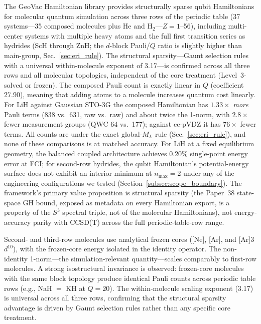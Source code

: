 \documentclass[twocolumn,pra,amsmath,amssymb,superscriptaddress]{revtex4-2}
\newcommand{\gvq}[2]{#2}
\begin{document}
The GeoVac Hamiltonian library provides structurally sparse qubit
Hamiltonians for molecular quantum simulation across three rows
of the periodic table (37 systems---35 composed molecules plus He and
H$_2$---$Z = 1$--56), including multi-center systems with multiple heavy
atoms and the full first transition series as hydrides (ScH through ZnH;
the $d$-block Pauli/$Q$ ratio is slightly higher than main-group,
Sec.~\ref{sec:eri_rule}).  The
structural sparsity---Gaunt selection
rules with a universal within-molecule exponent of 3.17---is confirmed
across all three rows and all molecular
topologies, independent of the core treatment (Level~3-solved or frozen).
The composed Pauli count is exactly linear in $Q$ (coefficient
$27.90$), meaning that adding atoms to a molecule increases
quantum cost linearly.
For LiH against Gaussian STO-3G the composed Hamiltonian has
$1.33\times$ \emph{more} Pauli terms (838 vs.\ \gvq{lih_sto3g_raw}{631}, raw vs.\ raw) and about
twice the 1-norm, with $2.8\times$ fewer measurement groups (QWC 64
vs.\ \gvq{lih_sto3g_qwc}{177}); against cc-pVDZ it has $76\times$ fewer terms.  All counts
are under the exact global-$M_L$ rule (Sec.~\ref{sec:eri_rule}), and
none of these comparisons is at matched accuracy.  For LiH
at a fixed equilibrium geometry, the balanced coupled architecture
achieves 0.20\% single-point energy error at FCI; for second-row
hydrides, the qubit Hamiltonian's potential-energy surface does not
exhibit an interior minimum at $n_{\max}=2$ under any of the engineering
configurations we tested (Section~\ref{subsec:scope_boundary}).  The
framework's primary value proposition is structural sparsity (the
Paper~38 state-space GH bound, exposed as metadata on every Hamiltonian
export, is a property of the $S^3$ spectral triple, not of the molecular
Hamiltonians), not energy-accuracy parity with
CCSD(T) across the full periodic-table-row range.

Second- and third-row molecules use analytical frozen cores
([Ne], [Ar], and [Ar]3$d^{10}$), with the frozen-core energy
isolated in the identity operator.  The non-identity 1-norm---the
simulation-relevant quantity---scales comparably to first-row
molecules.  A strong isostructural invariance is observed:
frozen-core molecules with the same block topology produce
identical Pauli counts across periodic table rows (e.g.,
NaH $=$ KH at $Q = 20$).
The within-molecule scaling exponent (3.17) is universal across all three
rows, confirming that the structural sparsity advantage is driven by
Gaunt selection rules rather than any specific core treatment.
\end{document}
